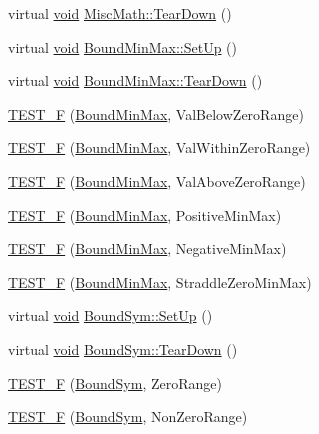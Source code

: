 \begin{DoxyCompactItemize}
virtual \hyperlink{group___n_a_m_e_ga18028b8badbf1ea7e704ccac3c488e82}{void} \hyperlink{group___unit_tests_gaee049bdfbeb6e7117415c472da634038}{Misc\-Math\-::\-Tear\-Down} ()
\item 
virtual \hyperlink{group___n_a_m_e_ga18028b8badbf1ea7e704ccac3c488e82}{void} \hyperlink{group___unit_tests_gaa083f26ac602b6553ebd522ebce74b44}{Bound\-Min\-Max\-::\-Set\-Up} ()
\item 
virtual \hyperlink{group___n_a_m_e_ga18028b8badbf1ea7e704ccac3c488e82}{void} \hyperlink{group___unit_tests_ga5b1a04dbcaaa9db5e928c59c87d81a69}{Bound\-Min\-Max\-::\-Tear\-Down} ()
\item 
\hyperlink{group___unit_tests_ga616b42d75c14427fb433a0efc0dcc8d0}{T\-E\-S\-T\-\_\-\-F} (\hyperlink{class_bound_min_max}{Bound\-Min\-Max}, Val\-Below\-Zero\-Range)
\item 
\hyperlink{group___unit_tests_ga7b82883b4c8ff0d533a5b3923e8845fd}{T\-E\-S\-T\-\_\-\-F} (\hyperlink{class_bound_min_max}{Bound\-Min\-Max}, Val\-Within\-Zero\-Range)
\item 
\hyperlink{group___unit_tests_ga132356b391d86ecdf50208ce16363129}{T\-E\-S\-T\-\_\-\-F} (\hyperlink{class_bound_min_max}{Bound\-Min\-Max}, Val\-Above\-Zero\-Range)
\item 
\hyperlink{group___unit_tests_gaa62459355b2c84ef788d4bb84f924458}{T\-E\-S\-T\-\_\-\-F} (\hyperlink{class_bound_min_max}{Bound\-Min\-Max}, Positive\-Min\-Max)
\item 
\hyperlink{group___unit_tests_ga55f8b8b58267f37c46e74ff9a02c3552}{T\-E\-S\-T\-\_\-\-F} (\hyperlink{class_bound_min_max}{Bound\-Min\-Max}, Negative\-Min\-Max)
\item 
\hyperlink{group___unit_tests_ga2bfe3239906784d1c3bc974c164a8ac1}{T\-E\-S\-T\-\_\-\-F} (\hyperlink{class_bound_min_max}{Bound\-Min\-Max}, Straddle\-Zero\-Min\-Max)
\item 
virtual \hyperlink{group___n_a_m_e_ga18028b8badbf1ea7e704ccac3c488e82}{void} \hyperlink{group___unit_tests_ga3b1ffcc33db9c2489206486310736009}{Bound\-Sym\-::\-Set\-Up} ()
\item 
virtual \hyperlink{group___n_a_m_e_ga18028b8badbf1ea7e704ccac3c488e82}{void} \hyperlink{group___unit_tests_gac3c27344e8473b0cfba42ddd7e28b509}{Bound\-Sym\-::\-Tear\-Down} ()
\item 
\hyperlink{group___unit_tests_gadd176ad6c420571ec24f5b96f9578e5b}{T\-E\-S\-T\-\_\-\-F} (\hyperlink{class_bound_sym}{Bound\-Sym}, Zero\-Range)
\item 
\hyperlink{group___unit_tests_ga548005fd2118ab3d1421a52580886532}{T\-E\-S\-T\-\_\-\-F} (\hyperlink{class_bound_sym}{Bound\-Sym}, Non\-Zero\-Range)

\end{DoxyCompactItemize}
